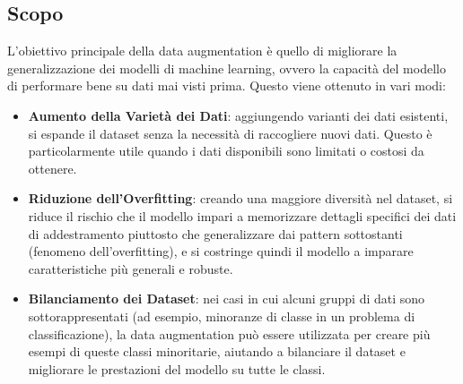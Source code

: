 \subsection{Scopo}
L'obiettivo principale della data augmentation è quello di migliorare la generalizzazione dei modelli di machine learning, ovvero la capacità del modello di performare bene su dati mai visti prima. Questo viene ottenuto in vari modi:
\begin{itemize}
  \item \textbf{Aumento della Varietà dei Dati}: aggiungendo varianti dei dati esistenti, si espande il dataset senza la necessità di raccogliere nuovi dati. Questo è particolarmente utile quando i dati disponibili sono limitati o costosi da ottenere.
  \item \textbf{Riduzione dell'Overfitting}: creando una maggiore diversità nel dataset, si riduce il rischio che il modello impari a memorizzare dettagli specifici dei dati di addestramento piuttosto che generalizzare dai pattern sottostanti (fenomeno dell'overfitting), e si costringe quindi il modello a imparare caratteristiche più generali e robuste.
  \item \textbf{Bilanciamento dei Dataset}: nei casi in cui alcuni gruppi di dati sono sottorappresentati (ad esempio, minoranze di classe in un problema di classificazione), la data augmentation può essere utilizzata per creare più esempi di queste classi minoritarie, aiutando a bilanciare il dataset e migliorare le prestazioni del modello su tutte le classi.
\end{itemize}

\newpage
